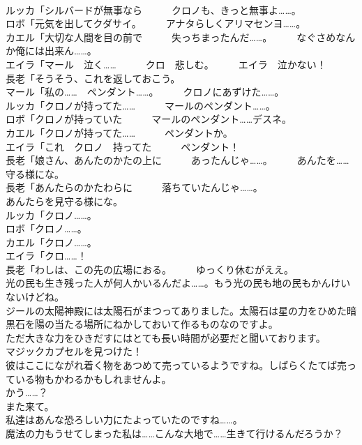 \documentclass[8pt]{extreport}
\begin{document}
\begin{CJK}{UTF8}{min}
\\	ルッカ「シルバードが無事なら　　　クロノも、きっと無事よ……。	
\\	ロボ「元気を出してクダサイ。　　　アナタらしくアリマセンヨ……。	
\\	カエル「大切な人間を目の前で　　　失っちまったんだ……。　　　なぐさめなんか俺には出来ん……。	
\\	エイラ「マール　泣く……　　　クロ　悲しむ。　　　エイラ　泣かない！	
\\	長老「そうそう、これを返しておこう。	
\\	マール「私の……　ペンダント……。　　　クロノにあずけた……。	
\\	ルッカ「クロノが持ってた……　　　マールのペンダント……。	
\\	ロボ「クロノが持っていた　　　マールのペンダント……デスネ。	
\\	カエル「クロノが持ってた……　　　ペンダントか。	
\\	エイラ「これ　クロノ　持ってた　　　ペンダント！	
\\	長老「娘さん、あんたのかたの上に　　　あったんじゃ……。　　　あんたを……　守る様にな。	
\\	長老「あんたらのかたわらに　　　落ちていたんじゃ……。	
\\	あんたらを見守る様にな。	
\\	ルッカ「クロノ……。	
\\	ロボ「クロノ……。	
\\	カエル「クロノ……。	
\\	エイラ「クロ……！	
\\	長老「わしは、この先の広場におる。　　　ゆっくり休むがええ。	
\\	光の民も生き残った人が何人かいるんだよ……。もう光の民も地の民もかんけいないけどね。	
\\	ジールの太陽神殿には太陽石がまつってありました。太陽石は星の力をひめた暗黒石を陽の当たる場所にねかしておいて作るものなのですよ。	
\\	ただ大きな力をひきだすにはとても長い時間が必要だと聞いております。	
\\	マジックカプセルを見つけた！	
\\	彼はここにながれ着く物をあつめて売っているようですね。しばらくたてば売っている物もかわるかもしれませんよ。	
\\	かう……？	
\\	また来て。	
\\	私達はあんな恐ろしい力にたよっていたのですね……。	
\\	魔法の力もうせてしまった私は……こんな大地で……生きて行けるんだろうか？	

\end{CJK}
\end{document}
